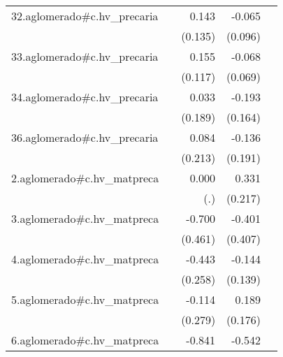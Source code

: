 {\begin{longtable}{l*{4}{D{.}{.}{-1}}}
\addlinespace
32.aglomerado#c.hv\_precaria&                     &       0.143         &      -0.065         &                     \\
            &                     &     (0.135)         &     (0.096)         &                     \\
\addlinespace
33.aglomerado#c.hv\_precaria&                     &       0.155         &      -0.068         &                     \\
            &                     &     (0.117)         &     (0.069)         &                     \\
\addlinespace
34.aglomerado#c.hv\_precaria&                     &       0.033         &      -0.193         &                     \\
            &                     &     (0.189)         &     (0.164)         &                     \\
\addlinespace
36.aglomerado#c.hv\_precaria&                     &       0.084         &      -0.136         &                     \\
            &                     &     (0.213)         &     (0.191)         &                     \\
\addlinespace
2.aglomerado#c.hv\_matpreca&                     &       0.000         &       0.331         &                     \\
            &                     &         (.)         &     (0.217)         &                     \\
\addlinespace
3.aglomerado#c.hv\_matpreca&                     &      -0.700         &      -0.401         &                     \\
            &                     &     (0.461)         &     (0.407)         &                     \\
\addlinespace
4.aglomerado#c.hv\_matpreca&                     &      -0.443         &      -0.144         &                     \\
            &                     &     (0.258)         &     (0.139)         &                     \\
\addlinespace
5.aglomerado#c.hv\_matpreca&                     &      -0.114         &       0.189         &                     \\
            &                     &     (0.279)         &     (0.176)         &                     \\
\addlinespace
6.aglomerado#c.hv\_matpreca&                     &      -0.841\sym{**} &      -0.542\sym{*}  &                     \\

\end{longtable}}
